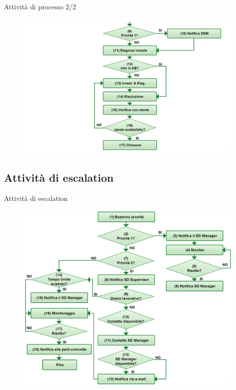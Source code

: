 \begin{frame}{Attività di processo \small{2/2}}
\begin{figure}
\includegraphics[scale=0.22]{Images/Incident_management_2.png}
\end{figure}
\end{frame}

\subsection*{Attività di escalation}
\begin{frame}{Attività di escalation}
\begin{figure}
\includegraphics[scale=0.19]{Images/Incident_management_escalation.png}
\end{figure}
\end{frame}